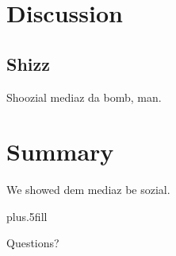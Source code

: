 \documentclass{beamer}
\begin{document}
\section{Discussion}

\subsection{Shizz}

\begin{frame}
  Shoozial mediaz da bomb, man.
\end{frame}

\section*{Summary}

\begin{frame}
  We showed dem mediaz be sozial.

  
  \pause
  \vskip0pt plus.5fill

  Questions?
\end{frame}
\end{document}
